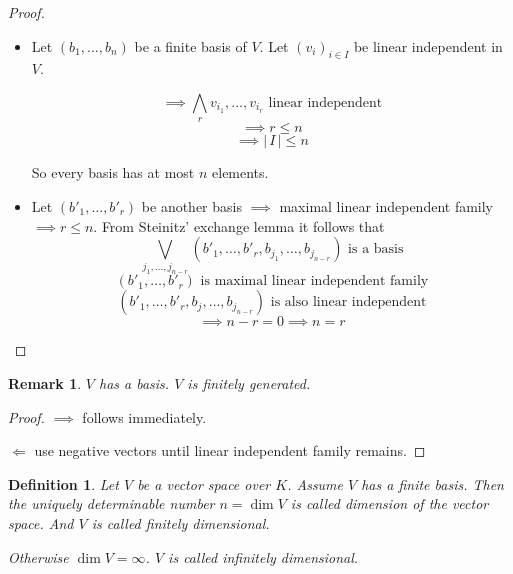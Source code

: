 \documentclass[a4paper,landscape,twocolumn]{article}
\newcommand\card[1]{\left|\,#1\,\right|}
\newtheorem{defi}{Definition}[section]
\newtheorem{rem}{Remark}[section]
\begin{document}
\begin{proof}
  \begin{itemize}
    \item
      Let $(b_1, \dots, b_n)$ be a finite basis of $V$.
      Let $(v_i)_{i \in I}$ be linear independent in $V$.

      \[ \implies \bigwedge_{r} v_{i_1}, \dots, v_{i_r} \text{ linear independent} \]
      \[ \implies r \leq n \]
      \[ \implies \card{I} \leq n \]

      So every basis has at most $n$ elements.

    \item
      Let $(b'_1, \dots, b'_r)$ be another basis $\implies$ maximal linear independent family $\implies r \leq n$.
      From Steinitz' exchange lemma it follows that
      \[ \bigvee_{j_1, \dots, j_{n-r}} (b'_1, \dots, b'_r, b_{j_1}, \dots, b_{j_{n-r}}) \text{ is a basis} \]
      \[ (b'_1, \dots, b'_r) \text{ is maximal linear independent family} \]
      \[ (b'_1, \dots, b'_r, b_j, \dots, b_{j_{n-r}}) \text{ is also linear independent} \]
      \[ \implies n - r = 0 \implies n = r \]
  \end{itemize}
\end{proof}

\begin{rem}
  \label{3-29}
  $V$ has a basis. $V$ is finitely generated.
\end{rem}

\begin{proof}
  $\implies$ follows immediately.

  $\Leftarrow$ use negative vectors until linear independent family remains.
\end{proof}

\begin{defi}
  Let $V$ be a vector space over $K$.
  Assume $V$ has a finite basis.
  Then the uniquely determinable number $n = \dim{V}$ is called dimension of the vector space.
  And $V$ is called \emph{finitely dimensional}.

  Otherwise $\dim{V} = \infty$. $V$ is called \emph{infinitely dimensional}.
\end{defi}
\end{document}
